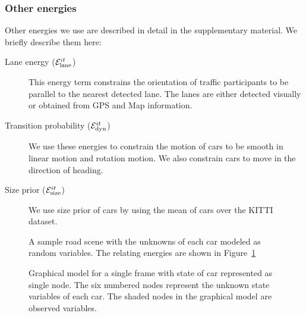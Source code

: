 \subsubsection{Other energies}
Other energies we use are described in detail in the supplementary material. We briefly describe them here:
\begin{description}
  \item[Lane energy ($\mathcal{E}^{it}_{\text{lane}}$)] This energy term constrains the
    orientation of traffic participants to be parallel to the nearest detected
    lane. The lanes are either detected visually or obtained from GPS and Map 
    information.
  \item[Transition probability ($\mathcal{E}^{it}_{\text{dyn}}$)] We use these energies to
    constrain the motion of cars to be smooth in linear motion and rotation
    motion. We also constrain cars to move in the direction of heading.
  \item[Size prior ($\mathcal{E}^{it}_{\text{size}}$)] We use size prior of cars by using the mean
    of cars over the KITTI dataset.
\end{description}



\begin{figure}
  \centering
  \newcommand{\imagewidth}{\columnwidth}
  
  \caption{A sample road scene with the unknowns of each car modeled as random variables. 
  The relating energies are shown in Figure~\ref{fig:graphmodel}}
\end{figure}
\begin{figure}
    
    \caption{Graphical model for a single frame with state of car represented
    as single node.  The six numbered nodes represent the unknown state variables of each car. The shaded nodes in the graphical model are observed variables. }
  \label{fig:graphmodel}
\end{figure}

